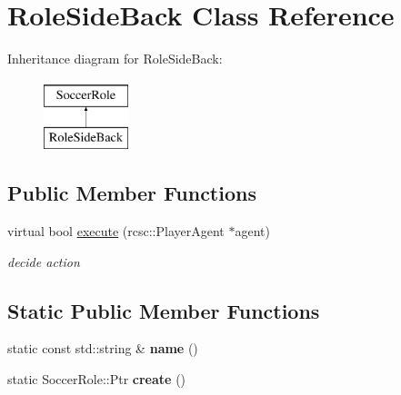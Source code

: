 \hypertarget{classRoleSideBack}{
\section{RoleSideBack Class Reference}
\label{classRoleSideBack}
}
Inheritance diagram for RoleSideBack:\begin{figure}[H]
\begin{center}
\leavevmode
\includegraphics[height=2.000000cm]{classRoleSideBack}
\end{center}
\end{figure}
\subsection*{Public Member Functions}
\begin{DoxyCompactItemize}
\item 
\hypertarget{classRoleSideBack_ac816d3a236cc41991f87f601a224ec63}{
virtual bool \hyperlink{classRoleSideBack_ac816d3a236cc41991f87f601a224ec63}{execute} (rcsc::PlayerAgent $\ast$agent)}
\label{classRoleSideBack_ac816d3a236cc41991f87f601a224ec63}

\begin{DoxyCompactList}\small\item\em decide action \item\end{DoxyCompactList}\end{DoxyCompactItemize}
\subsection*{Static Public Member Functions}
\begin{DoxyCompactItemize}
\item 
\hypertarget{classRoleSideBack_a17ee109fe522f786b333a77e91777699}{
static const std::string \& {\bfseries name} ()}
\label{classRoleSideBack_a17ee109fe522f786b333a77e91777699}

\item 
\hypertarget{classRoleSideBack_a091a522010390c0dcaf4c1c4fec221d0}{
static SoccerRole::Ptr {\bfseries create} ()}
\label{classRoleSideBack_a091a522010390c0dcaf4c1c4fec221d0}

\end{DoxyCompactItemize}
